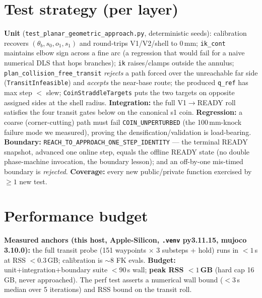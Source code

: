\documentclass[11pt]{article}
\newcommand{\code}[1]{\texttt{\small #1}}
\begin{document}
\section{Test strategy (per layer)}
\textbf{Unit} (\code{test\_planar\_geometric\_approach.py}, deterministic seeds): calibration recovers
$(\theta_b,s_0,o_1,s_1)$ and round-trips V1/V2/shell to $0$\,mm; \code{ik\_cont} maintains elbow sign across a fine arc
(a regression that would fail for a naive numerical DLS that hops branches); \code{ik} raises/clamps outside the annulus;
\code{plan\_collision\_free\_transit} \emph{rejects} a path forced over the unreachable far side (\code{TransitInfeasible})
and \emph{accepts} the near-base route; the produced \code{q\_ref} has max step $<$ slew; \code{CoinStraddleTargets} puts
the two targets on opposite assigned sides at the shell radius.
\textbf{Integration:} the full V1$\to$READY roll satisfies the four transit gates below on the canonical s1 coin.
\textbf{Regression:} a coarse (corner-cutting) path must fail \code{COIN\_UNPERTURBED} (the 100\,mm-knock failure mode we
measured), proving the densification/validation is load-bearing.
\textbf{Boundary:} \code{REACH\_TO\_APPROACH\_ONE\_STEP\_IDENTITY} --- the terminal READY snapshot, advanced one online
step, equals the offline READY state (no double phase-machine invocation, the boundary lesson); and an off-by-one
mis-timed boundary is \emph{rejected}.
\textbf{Coverage:} every new public/private function exercised by $\ge1$ new test.

\section{Performance budget}
\textbf{Measured anchors (this host, Apple-Silicon, \code{.venv} py3.11.15, mujoco 3.10.0):} the full transit probe (151
waypoints $\times$ 3 substeps + hold) runs in $<1$\,s at RSS $<0.3$\,GB; calibration is $\sim$8 FK evals. \textbf{Budget:}
unit+integration+boundary suite $<90$\,s wall; \textbf{peak RSS $<1$\,GB} (hard cap 16\,GB, never approached). The perf
test asserts a numerical wall bound ($<3$\,s median over 5 iterations) and RSS bound on the transit roll.
\end{document}
